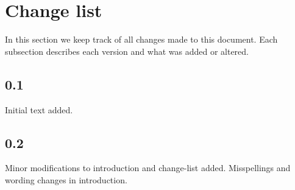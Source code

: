 \section{Change list}\label{change_list}
In this section we keep track of all changes made to this document. Each subsection describes each version and what was added or altered.

\subsection{0.1}
Initial text added.

\subsection{0.2}
Minor modifications to introduction and change-list added. Misspellings and wording changes in introduction.
